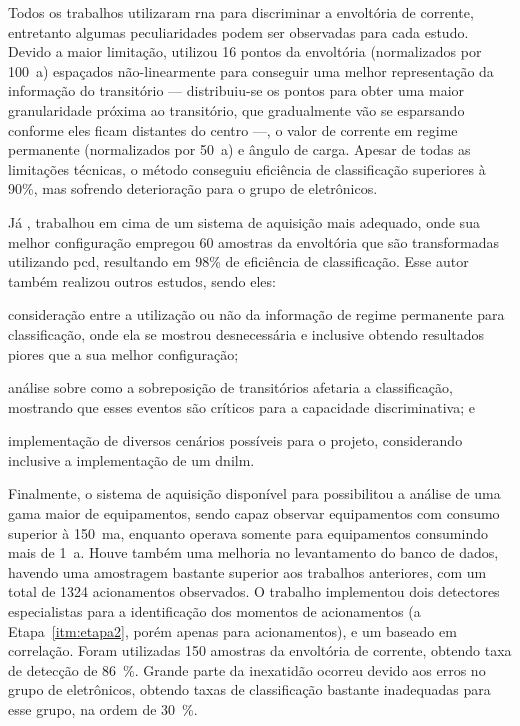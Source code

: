 Todos os trabalhos utilizaram \gls{rna} para discriminar a envoltória
de corrente, entretanto algumas peculiaridades podem ser observadas
para cada estudo. Devido a maior limitação, \citet*{nilm_cepel_aguiar}
utilizou 16 pontos da envoltória (normalizados por 100~\acs{a})
espaçados não-linearmente para conseguir uma melhor representação da
informação do transitório --- distribuiu-se os pontos para obter uma
maior granularidade próxima ao transitório, que gradualmente vão se
esparsando conforme eles ficam distantes do centro ---, o valor de
corrente em regime permanente (normalizados por 50~\acs{a}) e
ângulo de carga. Apesar de todas as limitações técnicas, o método
conseguiu eficiência de classificação superiores à 90\%, mas sofrendo
deterioração para o grupo de eletrônicos.

Já \citet{nilm_cepel_bezerra}, trabalhou em cima de um sistema
de aquisição mais adequado, onde sua melhor configuração empregou 60 amostras
da envoltória que são transformadas utilizando \gls{pcd}, resultando
em 98\% de eficiência de classificação.  Esse autor também realizou
outros estudos, sendo eles:
\begin{enumerate*}[label=\itshape\alph*\upshape)]
\item consideração entre a utilização ou não da informação de regime
permanente para classificação, onde ela se mostrou desnecessária e
inclusive obtendo resultados piores que a sua melhor configuração;
\item análise sobre como a sobreposição de transitórios afetaria a
classificação, mostrando que esses eventos são críticos para a
capacidade discriminativa; e
\item implementação de diversos cenários possíveis para o projeto,
considerando inclusive a implementação de um \gls{dnilm}.
\end{enumerate*}

Finalmente, o sistema de aquisição disponível para
\citet*{nilm_cepel_alvaro} possibilitou a análise de uma gama
maior de equipamentos, sendo capaz observar equipamentos com
consumo superior à 150~m\acs{a}, enquanto
\citet*{nilm_cepel_aguiar} operava somente para equipamentos consumindo
mais de 1~\acs{a}. Houve também uma melhoria no
levantamento do banco de dados, havendo uma amostragem bastante
superior aos trabalhos anteriores, com um total de 1324 acionamentos
observados. O trabalho implementou dois detectores especialistas para
a identificação dos momentos de acionamentos (a
Etapa~\ref{itm:etapa2}, porém apenas para acionamentos), e um baseado
em correlação. Foram utilizadas 150 amostras da envoltória de
corrente, obtendo taxa de detecção de 86~\%.  Grande parte da
inexatidão ocorreu devido aos erros no grupo de eletrônicos, obtendo
taxas de classificação bastante inadequadas para esse grupo, na ordem
de 30~\%.

